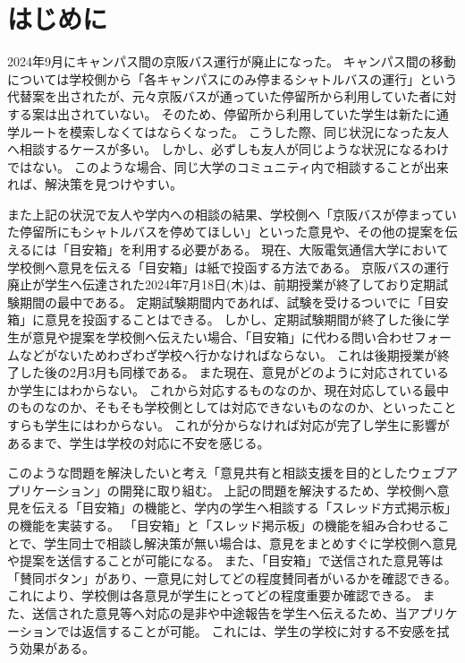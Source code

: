\documentclass[main]{subfiles}
\begin{document}
\chapter{はじめに}
\label{cha:intro}

2024年9月にキャンパス間の京阪バス運行が廃止になった。
キャンパス間の移動については学校側から「各キャンパスにのみ停まるシャトルバスの運行」という代替案を出されたが、元々京阪バスが通っていた停留所から利用していた者に対する案は出されていない。
そのため、停留所から利用していた学生は新たに通学ルートを模索しなくてはならくなった。
こうした際、同じ状況になった友人へ相談するケースが多い。
しかし、必ずしも友人が同じような状況になるわけではない。
このような場合、同じ大学のコミュニティ内で相談することが出来れば、解決策を見つけやすい。

また上記の状況で友人や学内への相談の結果、学校側へ「京阪バスが停まっていた停留所にもシャトルバスを停めてほしい」といった意見や、その他の提案を伝えるには「目安箱」を利用する必要がある。
現在、大阪電気通信大学において学校側へ意見を伝える「目安箱」は紙で投函する方法である。
京阪バスの運行廃止が学生へ伝達された2024年7月18日(木)は、前期授業が終了しており定期試験期間の最中である。
定期試験期間内であれば、試験を受けるついでに「目安箱」に意見を投函することはできる。
しかし、定期試験期間が終了した後に学生が意見や提案を学校側へ伝えたい場合、「目安箱」に代わる問い合わせフォームなどがないためわざわざ学校へ行かなければならない。
これは後期授業が終了した後の2月3月も同様である。
また現在、意見がどのように対応されているか学生にはわからない。
これから対応するものなのか、現在対応している最中のものなのか、そもそも学校側としては対応できないものなのか、といったことすらも学生にはわからない。
これが分からなければ対応が完了し学生に影響があるまで、学生は学校の対応に不安を感じる。

このような問題を解決したいと考え「意見共有と相談支援を目的としたウェブアプリケーション」の開発に取り組む。
上記の問題を解決するため、学校側へ意見を伝える「目安箱」の機能と、学内の学生へ相談する「スレッド方式掲示板」の機能を実装する。
「目安箱」と「スレッド掲示板」の機能を組み合わせることで、学生同士で相談し解決策が無い場合は、意見をまとめすぐに学校側へ意見や提案を送信することが可能になる。
また、「目安箱」で送信された意見等は「賛同ボタン」があり、一意見に対してどの程度賛同者がいるかを確認できる。
これにより、学校側は各意見が学生にとってどの程度重要か確認できる。
また、送信された意見等へ対応の是非や中途報告を学生へ伝えるため、当アプリケーションでは返信することが可能。
これには、学生の学校に対する不安感を拭う効果がある。
\end{document}
